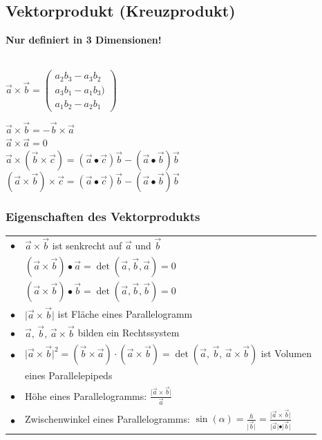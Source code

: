		    
		    
		    
			\subsection{Vektorprodukt (Kreuzprodukt)}		    
		    \textbf{Nur definiert in 3 Dimensionen!} \\
		    \\
		    \begin{minipage}{0.45\linewidth}
		    $\vec{a} \times \vec{b} = \begin{pmatrix} a_2 b_3 - a_3 b_2 \\ a_3 b_1 - a_1 b_3) \\ a_1 b_2 - a_2 b_1 \end{pmatrix}$ \\
		    \end{minipage}
		    \hfill
		    \begin{minipage}{0.5\linewidth}
		    $\vec{a} \times \vec{b} = -\vec{b} \times \vec{a}$ \\
		    $\vec{a} \times \vec{a} = 0$ \\
		    $\vec{a} \times (\vec{b} \times \vec{c}) = (\vec{a} \bullet \vec{c}) \vec{b} - (\vec{a} \bullet \vec{b}) \vec{b}$ \\
		    $(\vec{a} \times \vec{b}) \times \vec{c} = (\vec{a} \bullet \vec{c}) \vec{b} - (\vec{a} \bullet \vec{b}) \vec{b}$
		    \end{minipage}
		    
		    
		    \subsubsection{Eigenschaften des Vektorprodukts}
		    
		    \begin{tabular}{ll}
		    $\bullet$ & $\vec{a} \times \vec{b}$ ist senkrecht auf $\vec{a}$ und $\vec{b}$\\
		    & $( \vec{a} \times \vec{b}) \bullet \vec{a} = \det(\vec{a}, \vec{b}, \vec{a}) = 0$\\
		    & $( \vec{a} \times \vec{b}) \bullet \vec{b} = \det(\vec{a}, \vec{b}, \vec{b}) = 0$\\
		    $\bullet$ & $\vert \vec{a} \times \vec{b} \vert$ ist Fläche eines Parallelogramm \\ 
		    $\bullet$ & $\vec{a}, \, \vec{b}, \, \vec{a} \times \vec{b}$ bilden ein Rechtssystem \\
		    $\bullet$ & $\vert \vec{a} \times \vec{b} \vert ^2 = (\vec{b} \times \vec{a}) \cdot (\vec{a} \times \vec{b}) = \det(\vec{a}, \, \vec{b}, \, \vec{a} \times \vec{b})$  ist Volumen\\
		    &  eines Parallelepipeds \\
		    $\bullet$ & Höhe eines Parallelogramms: $\frac{\vert \vec{a} \times \vec{b} \vert}{\vec{a}}$ \\
		      $\bullet$ & Zwischenwinkel eines Parallelogramms: $\sin(\alpha) = \frac{h}{\vert \vec{b} \vert} = \frac{\vert \vec{a} \times \vec{b} \vert}{\vert \vec{a} \vert \bullet \vert \vec{b} \vert}$ \\
		    \end{tabular}
		    
